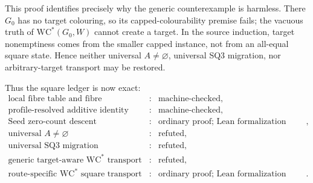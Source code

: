 This proof identifies precisely why the generic counterexample is harmless.
There \(G_0\) has no target colouring, so its capped-colourability premise
fails; the vacuous truth of \(\mathrm{WC}^{*}(G_0,W)\) cannot create a
target.  In the source induction, target nonemptiness comes from the smaller
capped instance, not from an all-equal square state.  Hence neither
universal \(A\ne\varnothing\), universal SQ3 migration, nor arbitrary-target
transport may be restored.

Thus the square ledger is now exact:
\[
\begin{array}{rcl}
\text{local fibre table and fibre connectivity}&:&\text{machine-checked},\\
\text{profile-resolved additive identity}&:&\text{machine-checked},\\
\text{Seed zero-count descent}&:&\text{ordinary proof; Lean formalization pending},\\
\text{universal }A\ne\varnothing&:&\text{refuted},\\
\text{universal SQ3 migration}&:&\text{refuted},\\
\text{generic target-aware }\mathrm{WC}^{*}\text{ transport}&:&\text{refuted},\\
\text{route-specific }\mathrm{WC}^{*}\text{ square transport}&:&
   \text{ordinary proof; Lean formalization pending}.
\end{array}
\]
